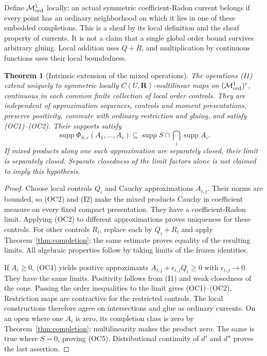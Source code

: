 \documentclass[11pt]{article}
\newtheorem{theorem}{Theorem}
\theoremstyle{remark}\newtheorem{remark}[theorem]{Remark}
\newcommand{\M}{\mathcal M^1}
\newcommand{\supp}{\operatorname{supp}}
\begin{document}
Define $\M_{\rm ord}$ locally: an actual symmetric coefficient-Radon
current belongs if every point has an ordinary neighborhood on which it
lies in one of these embedded completions. This is a sheaf by its local
definition and the sheaf property of currents. It is not a claim that a
single global order bound survives arbitrary gluing. Local addition uses
$Q+R$, and multiplication by continuous functions uses their local boundedness.

\begin{theorem}[Intrinsic extension of the mixed operations]\label{thm:extension}
The operations (I1) extend uniquely to symmetric locally
$C(U,\mathbf R)$-multilinear maps on $(\M_{\rm ord})^r$, continuous in
each common finite collection of local order controls. They are independent
of approximation sequences, controls and moment presentations, preserve
positivity, commute with ordinary restriction and gluing, and satisfy
(OC1)--(OC2). Their supports satisfy
\[
 \supp\Phi_{S,r}(A_1,\ldots,A_r)
       \subseteq\supp S\cap\bigcap_i\supp A_i.          \tag{OC5}
\]
If mixed products along one such approximation are separately closed,
their limit is separately closed. Separate closedness of the limit factors
alone is not claimed to imply this hypothesis.
\end{theorem}
\begin{proof}
Choose local controls $Q_i$ and Cauchy approximations $A_{i,j}$.
Their norms are bounded, so (OC2) and (I2) make the mixed products Cauchy
in coefficient measure on every fixed compact presentation. They have
a coefficient-Radon limit. Applying (OC2) to different approximations
proves uniqueness for these controls. For other controls $R_i$, replace
each by $Q_i+R_i$ and apply Theorem~\ref{thm:completion}; the same estimate
proves equality of the resulting limits. All algebraic properties follow
by taking limits of the frozen identities.

If $A_i\ge0$, (OC4) yields positive approximants
$A_{i,j}+\epsilon_{i,j}Q_i\ge0$ with $\epsilon_{i,j}\to0$.
They have the same limits. Positivity follows from (I1) and weak closedness
of the cone. Passing the order inequalities to the limit gives (OC1)--(OC2).
Restriction maps are contractive for the restricted controls. The local
constructions therefore agree on intersections and glue as ordinary
currents. On an open where one $A_i$ is zero, its completion class is zero
by Theorem~\ref{thm:completion}; multilinearity makes the product zero.
The same is true where $S=0$, proving (OC5). Distributional continuity
of $d'$ and $d''$ proves the last assertion.
\end{proof}
\end{document}
